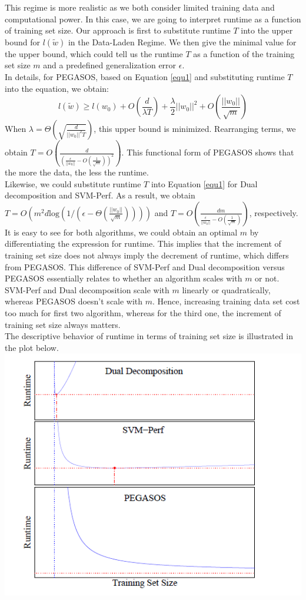 \documentclass[11pt,a4paper]{article}
\begin{document}
This regime is more realistic as we both consider limited training data and computational power. In this case, we are going to interpret runtime as a function of training set size. Our approach is first to substitute runtime $T$ into the upper bound for $l(\tilde{w})$ in the Data-Laden Regime. We then give the minimal value for the upper bound, which could tell us the runtime $T$ as a function of the training set size $m$ and a predefined generalization error $\epsilon$.\\ 
In details, for PEGASOS, based on Equation \ref{equ1} and substituting runtime $T$ into the equation, we obtain:
\begin{equation}
l(\tilde{w}) \geq l(w_0)+O(\frac{d}{\lambda T})+\frac{\lambda}{2}||w_0||^2+O(\frac{||w_0||}{\sqrt{m}})
\end{equation}
When $\lambda=\Theta(\sqrt{\frac{d}{||w_0||^2 T}})$, this upper bound is minimized. Rearranging terms, we obtain $T=O(\frac{d}{(\frac{\epsilon}{||w_0||}-O(\frac{1}{\sqrt{m}}))^2})$.
This functional form of PEGASOS shows that the more the data, the less the runtime.\\
Likewise, we could substitute runtime $T$ into Equation \ref{equ1} for Dual decomposition and SVM-Perf. As a result, we obtain $T=O(m^2 d \mbox{log}(1/(\epsilon-\Theta(\frac{||w_0||}{\sqrt{m}}))))$ and $T=O(\frac{dm}{\frac{\epsilon}{||w_0||}-O(\frac{1}{\sqrt{m}})})$, respectively.
It is easy to see for both algorithms, we could obtain an optimal $m$ by differentiating the expression for runtime. This implies that the increment of training set size does not always imply the decrement of runtime, which differs from PEGASOS. This difference of SVM-Perf and Dual decomposition versus PEGASOS essentially relates to whether an algorithm scales with $m$ or not. SVM-Perf and Dual decomposition scale with $m$ linearly or quadratically, whereas PEGASOS doesn't scale with $m$. Hence, increasing training data set cost too much for first two algorithm, whereas for the third one, the increment of training set size always matters.\\
The descriptive behavior of runtime in terms of training set size is illustrated in the plot below. 
\includegraphics[scale=1]{three_alg.PNG}
\end{document}
